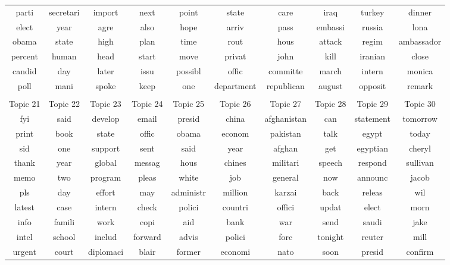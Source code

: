 \begin{tabular}{cccccccccc}
  parti      & secretari & import   & next     & point    & state      & care       & iraq     & turkey   & dinner \\
  elect      & year      & agre     & also     & hope     & arriv      & pass       & embassi  & russia   & lona \\
  obama      & state     & high     & plan     & time     & rout       & hous       & attack   & regim    & ambassador \\
  percent    & human     & head     & start    & move     & privat     & john       & kill     & iranian  & close \\
  candid     & day       & later    & issu     & possibl  & offic      & committe   & march    & intern   & monica \\
  poll       & mani      & spoke    & keep     & one      & department & republican & august   & opposit  & remark \\
  \bottomrule \\
  \toprule
  Topic 21 & Topic 22 & Topic 23  & Topic 24 & Topic 25  & Topic 26 & Topic 27    & Topic 28 & Topic 29  & Topic 30 \\
  \midrule
  fyi      & said     & develop   & email    & presid    & china    & afghanistan & can      & statement & tomorrow \\
  print    & book     & state     & offic    & obama     & econom   & pakistan    & talk     & egypt     & today \\
  sid      & one      & support   & sent     & said      & year     & afghan      & get      & egyptian  & cheryl \\
  thank    & year     & global    & messag   & hous      & chines   & militari    & speech   & respond   & sullivan \\
  memo     & two      & program   & pleas    & white     & job      & general     & now      & announc   & jacob \\
  pls      & day      & effort    & may      & administr & million  & karzai      & back     & releas    & wil \\
  latest   & case     & intern    & check    & polici    & countri  & offici      & updat    & elect     & morn \\
  info     & famili   & work      & copi     & aid       & bank     & war         & send     & saudi     & jake \\
  intel    & school   & includ    & forward  & advis     & polici   & forc        & tonight  & reuter    & mill \\
  urgent   & court    & diplomaci & blair    & former    & economi  & nato        & soon     & presid    & confirm \\
  \bottomrule
\end{tabular}
\setlength{\tabcolsep}{6pt}
